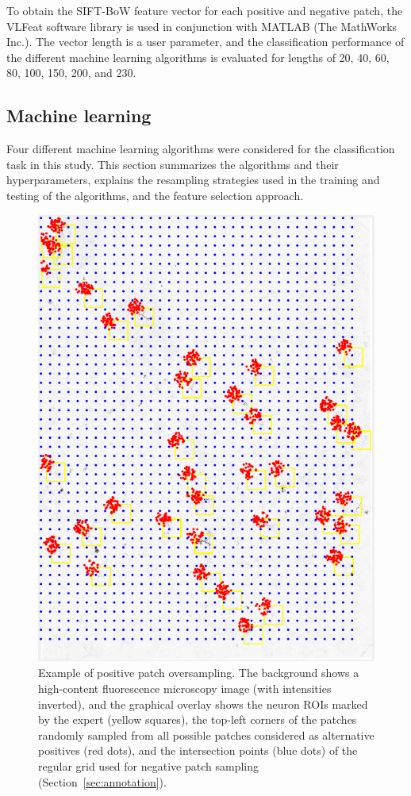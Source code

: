 To obtain the SIFT-BoW feature vector for each positive and negative patch, the VLFeat software library \cite{vedaldi2010vlfeat} is used in conjunction with MATLAB (The MathWorks Inc.). The vector length is a user parameter, and the classification performance of the different machine learning algorithms is evaluated for lengths of 20, 40, 60, 80, 100, 150, 200, and 230.

\subsection{Machine learning}
\label{subsec:machineLearning}
Four different machine learning algorithms were considered for the classification task in this study. This section summarizes the algorithms and their hyperparameters, explains the resampling strategies used in the training and testing of the algorithms, and the feature selection approach.
\begin{figure}[h!]
	\centering
	\includegraphics[width=0.8\columnwidth]{fig03}
	\caption{Example of positive patch oversampling. The background shows a high-content fluorescence microscopy image (with intensities inverted), and the graphical overlay shows the neuron ROIs marked by the expert (yellow squares), the top-left corners of the patches randomly sampled from all possible patches considered as alternative positives (red dots), and the intersection points (blue dots) of the regular grid used for negative patch sampling (Section~\ref{sec:annotation}).}
	\label{ch5_fig3}
\end{figure}
